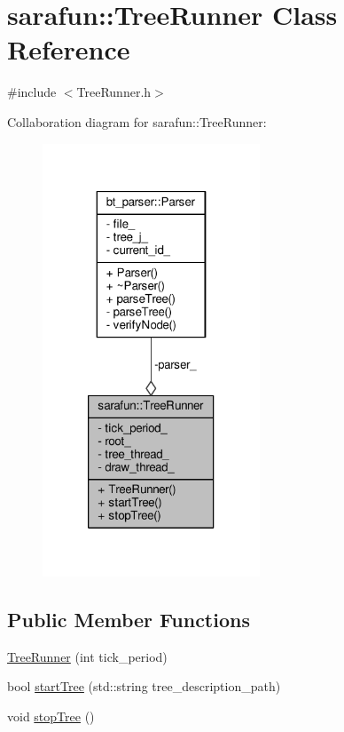 \hypertarget{classsarafun_1_1TreeRunner}{\section{sarafun\-:\-:Tree\-Runner Class Reference}
\label{classsarafun_1_1TreeRunner}
}


{\ttfamily \#include $<$Tree\-Runner.\-h$>$}



Collaboration diagram for sarafun\-:\-:Tree\-Runner\-:
\nopagebreak
\begin{figure}[H]
\begin{center}
\leavevmode
\includegraphics[width=184pt]{de/d3b/classsarafun_1_1TreeRunner__coll__graph}
\end{center}
\end{figure}
\subsection*{Public Member Functions}
\begin{DoxyCompactItemize}
\item 
\hyperlink{classsarafun_1_1TreeRunner_a0db16bb58de51d41730e8ee71a0243e4_a0db16bb58de51d41730e8ee71a0243e4}{Tree\-Runner} (int tick\-\_\-period)
\item 
bool \hyperlink{classsarafun_1_1TreeRunner_ad89a0d33af669afeae2c299a1dfc1848_ad89a0d33af669afeae2c299a1dfc1848}{start\-Tree} (std\-::string tree\-\_\-description\-\_\-path)
\item 
void \hyperlink{classsarafun_1_1TreeRunner_a447a35fa7aba8eb30c80546bf2d4ccca_a447a35fa7aba8eb30c80546bf2d4ccca}{stop\-Tree} ()
\end{DoxyCompactItemize}
